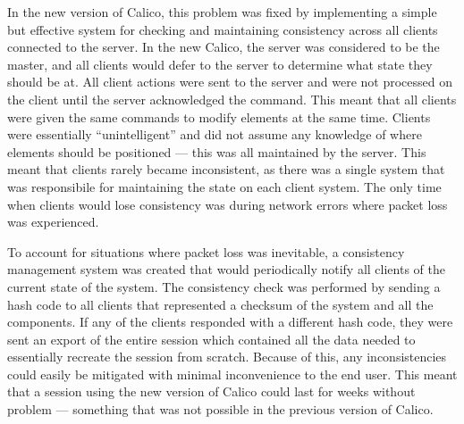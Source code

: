In the new version of Calico, this problem was fixed by implementing a simple but effective system for checking and maintaining consistency across all clients connected to the server. In the new Calico, the server was considered to be the master, and all clients would defer to the server to determine what state they should be at. All client actions were sent to the server and were not processed on the client until the server acknowledged the command. This meant that all clients were given the same commands to modify elements at the same time. Clients were essentially ``unintelligent'' and did not assume any knowledge of where elements should be positioned --- this was all maintained by the server. This meant that clients rarely became inconsistent, as there was a single system that was responsibile for maintaining the state on each client system. The only time when clients would lose consistency was during network errors where packet loss was experienced.

To account for situations where packet loss was inevitable, a consistency management system was created that would periodically notify all clients of the current state of the system. The consistency check was performed by sending a hash code to all clients that represented a checksum of the system and all the components. If any of the clients responded with a different hash code, they were sent an export of the entire session which contained all the data needed to essentially recreate the session from scratch. Because of this, any inconsistencies could easily be mitigated with minimal inconvenience to the end user. This meant that a session using the new version of Calico could last for weeks without problem --- something that was not possible in the previous version of Calico.







% 

